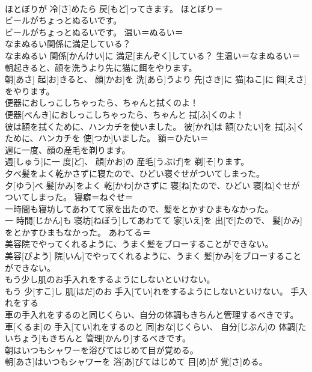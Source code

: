\documentclass[8pt]{extreport}
\begin{document}
\begin{CJK}{UTF8}{min}
\\	ほとぼりが 冷[さ]めたら 戻[もど]ってきます。	ほとぼり＝ 
\\	ビールがちょっとぬるいです。	
\\	ビールがちょっとぬるいです。	温い＝ぬるい＝ 
\\	なまぬるい関係に満足している？	
\\	なまぬるい 関係[かんけい]に 満足[まんぞく]している？	生温い＝なまぬるい＝ 
\\	朝起きると、顔を洗うより先に猫に餌をやります。	
\\	朝[あさ] 起[お]きると、 顔[かお]を 洗[あら]うより 先[さき]に 猫[ねこ]に 餌[えさ]をやります。	
\\	便器におしっこしちゃったら、ちゃんと拭くのよ！	
\\	便器[べんき]におしっこしちゃったら、ちゃんと 拭[ふ]くのよ！	
\\	彼は額を拭くために、ハンカチを使いました。		彼[かれ]は 額[ひたい]を 拭[ふ]くために、ハンカチを 使[つか]いました。	額＝ひたい＝ 
\\	週に一度、顔の産毛を剃ります。	
\\	週[しゅう]に一 度[ど]、 顔[かお]の 産毛[うぶげ]を 剃[そ]ります。	
\\	夕べ髪をよく乾かさずに寝たので、ひどい寝ぐせがついてしまった。	
\\	夕[ゆう]べ 髪[かみ]をよく 乾[かわ]かさずに 寝[ね]たので、ひどい 寝[ね]ぐせがついてしまった。	寝癖＝ねぐせ＝ 
\\	一時間も寝坊してあわてて家を出たので、髪をとかすひまもなかった。	
\\	一 時間[じかん]も 寝坊[ねぼう]してあわてて 家[いえ]を 出[で]たので、 髪[かみ]をとかすひまもなかった。	あわてる＝ 
\\	美容院でやってくれるように、うまく髪をブローすることができない。	
\\	美容[びよう] 院[いん]でやってくれるように、うまく 髪[かみ]をブローすることができない。	
\\	もう少し肌のお手入れをするようにしないといけない。	
\\	もう 少[すこ]し 肌[はだ]のお 手入[てい]れをするようにしないといけない。	手入れをする 
\\	車の手入れをするのと同じくらい、自分の体調もきちんと管理するべきです。	
\\	車[くるま]の 手入[てい]れをするのと 同[おな]じくらい、 自分[じぶん]の 体調[たいちょう]もきちんと 管理[かんり]するべきです。	
\\	朝はいつもシャワーを浴びてはじめて目が覚める。	
\\	朝[あさ]はいつもシャワーを 浴[あ]びてはじめて 目[め]が 覚[さ]める。	

\end{CJK}
\end{document}
